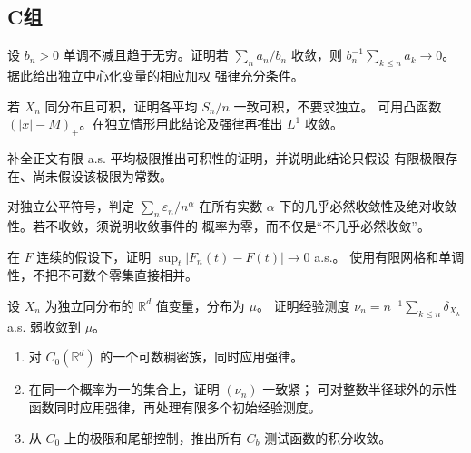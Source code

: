 \subsection*{C组}
\begin{enumerate}[label=\textbf{\thechapter.\arabic*.},resume]
设 $b_n>0$ 单调不减且趋于无穷。证明若 $\sum_na_n/b_n$ 收敛，则
$b_n^{-1}\sum_{k\le n}a_k\to0$。据此给出独立中心化变量的相应加权
强律充分条件。

若 $X_n$ 同分布且可积，证明各平均 $S_n/n$ 一致可积，不要求独立。
可用凸函数 $(|x|-M)_+$。在独立情形用此结论及强律再推出 $L^1$ 收敛。

补全正文有限 a.s. 平均极限推出可积性的证明，并说明此结论只假设
有限极限存在、尚未假设该极限为常数。

对独立公平符号，判定 $\sum_n\varepsilon_n/n^\alpha$ 在所有实数
$\alpha$ 下的几乎必然收敛性及绝对收敛性。若不收敛，须说明收敛事件的
概率为零，而不仅是“不几乎必然收敛”。

在 $F$ 连续的假设下，证明 $\sup_t|F_n(t)-F(t)|\to0$ a.s.。
使用有限网格和单调性，不把不可数个零集直接相并。

设 $X_n$ 为独立同分布的 $\mathbb R^d$ 值变量，分布为 $\mu$。
证明经验测度 $\nu_n=n^{-1}\sum_{k\le n}\delta_{X_k}$ a.s. 弱收敛到 $\mu$。
\begin{enumerate}[label=\textup{(\roman*)}]
\item 对 $C_0(\mathbb R^d)$ 的一个可数稠密族，同时应用强律。
\item 在同一个概率为一的集合上，证明 $(\nu_n)$ 一致紧；
可对整数半径球外的示性函数同时应用强律，再处理有限多个初始经验测度。
\item 从 $C_0$ 上的极限和尾部控制，推出所有 $C_b$ 测试函数的积分收敛。
\end{enumerate}
\end{enumerate}
